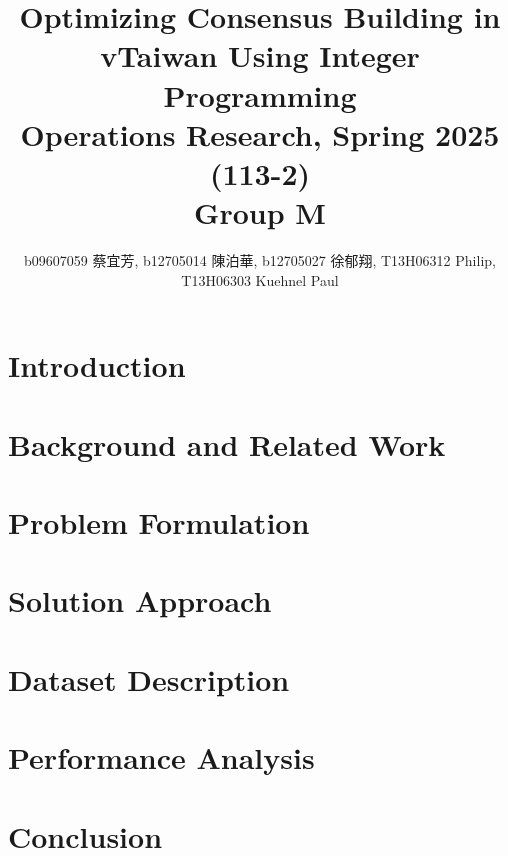 \documentclass[10pt]{article}
\title{Optimizing Consensus Building in vTaiwan Using Integer Programming \\
\large Operations Research, Spring 2025 (113-2) \\ Group M}
\author{b09607059 蔡宜芳, b12705014 陳泊華,
    b12705027 徐郁翔, T13H06312 Philip, T13H06303 Kuehnel Paul}
\affil{Department of Information Management, National Taiwan University}
\begin{document}
\maketitle


\section{Introduction}\label{sec:intro}


\section{Background and Related Work}\label{sec:background}


\section{Problem Formulation}\label{sec:problem_formulation}


%

\section{Solution Approach}\label{sec:solution}


\section{Dataset Description}\label{sec:experiments}


\section{Performance Analysis}\label{sec:performance}


\section{Conclusion}\label{sec:conclusion}


\printbibliography
\end{document}
